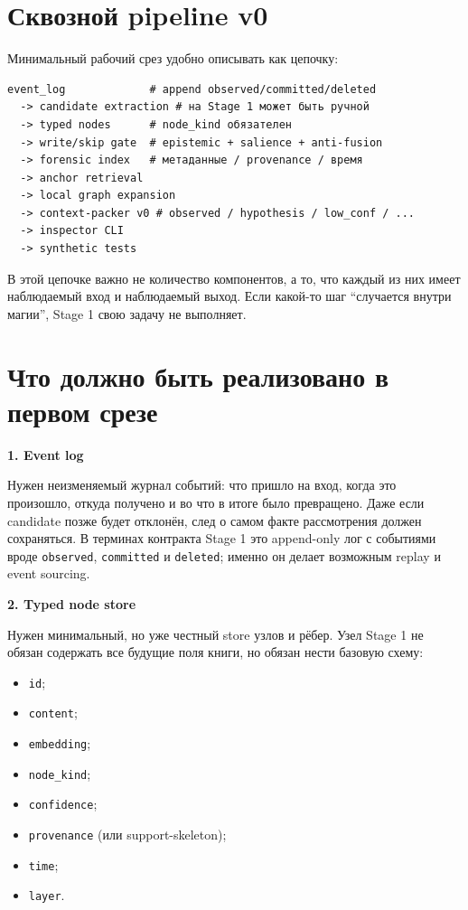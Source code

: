 \section{Сквозной pipeline v0}

Минимальный рабочий срез удобно описывать как цепочку:

\begin{lstlisting}[style=pseudo]
event_log             # append observed/committed/deleted
  -> candidate extraction # на Stage 1 может быть ручной
  -> typed nodes      # node_kind обязателен
  -> write/skip gate  # epistemic + salience + anti-fusion
  -> forensic index   # метаданные / provenance / время
  -> anchor retrieval
  -> local graph expansion
  -> context-packer v0 # observed / hypothesis / low_conf / ...
  -> inspector CLI
  -> synthetic tests
\end{lstlisting}

В этой цепочке важно не количество компонентов, а то, что каждый из них
имеет наблюдаемый вход и наблюдаемый выход. Если какой-то шаг ``случается
внутри магии'', Stage 1 свою задачу не выполняет.

\section{Что должно быть реализовано в первом срезе}

\textbf{1. Event log}

Нужен неизменяемый журнал событий: что пришло на вход, когда это произошло,
откуда получено и во что в итоге было превращено. Даже если candidate позже
будет отклонён, след о самом факте рассмотрения должен сохраняться. В
терминах контракта Stage 1 это append-only лог с событиями вроде
\texttt{observed}, \texttt{committed} и \texttt{deleted}; именно он делает
возможным replay и event sourcing.

\textbf{2. Typed node store}

Нужен минимальный, но уже честный store узлов и рёбер. Узел Stage 1 не обязан
содержать все будущие поля книги, но обязан нести базовую схему:

\begin{itemize}\itemsep2pt
\item \texttt{id};
\item \texttt{content};
\item \texttt{embedding};
\item \texttt{node\_kind};
\item \texttt{confidence};
\item \texttt{provenance} (или support-skeleton);
\item \texttt{time};
\item \texttt{layer}.
\end{itemize}

